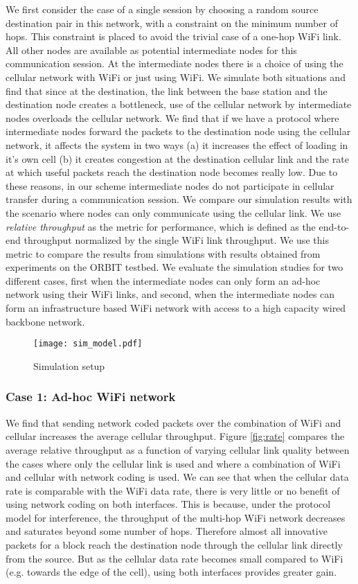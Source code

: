 \documentclass{sig-alternate-10pt}
\begin{document}
We first consider the case of a  single session by choosing a random source destination pair in this network, with a constraint on the minimum number of hops. This constraint is placed to avoid the trivial case of a one-hop WiFi link. All  other nodes are available as  potential intermediate nodes for this communication session. At the intermediate nodes there is a choice of using  the cellular network with WiFi or just using WiFi. We simulate both situations and find that since at the destination, the link between the  base station and the destination node creates a bottleneck, use of the cellular network by intermediate nodes overloads the cellular network.  
We find that if we have a protocol where intermediate nodes forward the packets to the destination node using the cellular network, it affects the system in two ways (a) it increases the effect of loading in it's own cell (b) it creates congestion at the destination cellular link and the rate at which useful packets reach the destination node becomes really low. Due to these reasons, in our scheme intermediate nodes do not participate in cellular transfer during a communication session.   We compare our simulation results with the scenario where nodes can only communicate using the cellular link. We use  \emph{relative throughput} as the metric for performance, which is defined as the end-to-end throughput normalized by the single WiFi link throughput. We use this metric to compare the results from simulations with results obtained from experiments on the ORBIT testbed. We evaluate the simulation studies  for two different cases, first when the intermediate nodes can only form an ad-hoc network using their WiFi links, and second, when the intermediate nodes can form an infrastructure based WiFi network with access to a high capacity wired backbone network.
\begin{figure}[t]
\begin{center}
\texttt{[image: sim\_model.pdf]}
\end{center}
\caption{Simulation setup}
\label{fig:simcell}
\end{figure}
\subsubsection{Case 1: Ad-hoc WiFi network}
We find that sending network coded packets over the combination of WiFi and cellular  increases the average cellular throughput. Figure \ref{fig:rate} compares the average relative throughput as a function of varying cellular link quality between the cases where only the cellular link is used and where a combination of WiFi and cellular with network coding is used. We can see that when the cellular data rate is comparable  with the WiFi data rate, there is very little or no benefit of using network coding on both interfaces. This is because, under the protocol model for interference, the throughput of the multi-hop WiFi network decreases and saturates beyond some number of hops. Therefore almost all innovative packets for a block reach the  destination node through the cellular link directly from  the source. But as the cellular data rate becomes small compared to WiFi (e.g. towards the edge of the cell), using both interfaces provides greater gain.
\end{document}
